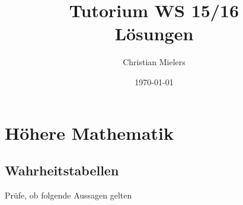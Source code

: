 \documentclass[11pt, a4paper]{article}
\title{Tutorium WS 15/16 \\ Lösungen}
\author{Christian Mielers}
\date{\today}
\begin{document}
\maketitle
\tableofcontents

\newpage
\section{Höhere Mathematik}
\subsection{Wahrheitstabellen}
Prüfe, ob folgende Aussagen gelten
\end{document}

